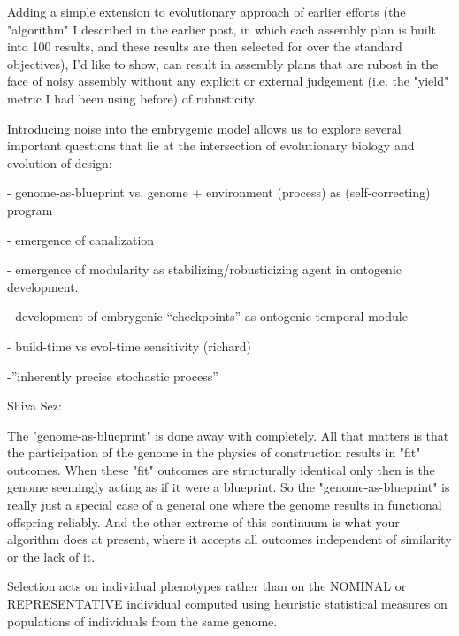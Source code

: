 \documentclass[11pt]{article}
\begin{document}
Adding a simple extension to evolutionary approach of earlier efforts
(the "algorithm" I described in the earlier post, in which each assembly
plan is built into 100 results, and these results are then selected for
over the standard objectives), I'd like to show, can result in assembly
plans that are rubost in the face of noisy assembly without any explicit
or external judgement (i.e. the "yield" metric I had been using before)
of rubusticity.

Introducing noise into the embrygenic model allows us to explore
several important questions that lie at the intersection of
evolutionary biology and evolution-of-design:

- genome-as-blueprint vs. genome + environment (process) as
(self-correcting) program

- emergence of canalization

- emergence of modularity as stabilizing/robusticizing agent in
ontogenic development.

- development of embrygenic ``checkpoints'' as ontogenic temporal
module

- build-time vs evol-time sensitivity (richard)

-''inherently precise stochastic process''
 
Shiva Sez:

 The "genome-as-blueprint" is done away with completely. All that 
   matters is that the participation of the genome in the physics of 
   construction results in "fit" outcomes. When these "fit" outcomes
   are structurally identical only then is the genome seemingly acting
   as if it were a blueprint. So the "genome-as-blueprint" is really 
   just a special case of a general one where the genome results in
   functional offspring reliably. And the other extreme of this continuum 
   is what your algorithm does at present, where it accepts all outcomes
   independent of similarity or the lack of it.

 Selection acts on individual phenotypes rather than on the NOMINAL or 
   REPRESENTATIVE individual computed using heuristic statistical 
   measures on populations of individuals from the same genome. 




\end{document}
